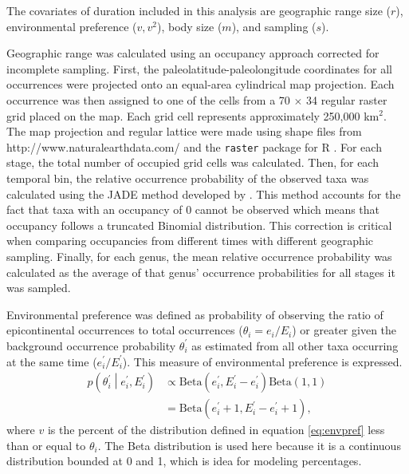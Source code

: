 \documentclass{article}
\begin{document}
The covariates of duration included in this analysis are geographic range size (\(r\)), environmental preference (\(v, v^{2}\)), body size (\(m\)), and sampling (\(s\)).

Geographic range was calculated using an occupancy approach corrected for incomplete sampling. First, the paleolatitude-paleolongitude coordinates for all occurrences were projected onto an equal-area cylindrical map projection. Each occurrence was then assigned to one of the cells from a 70 \(\times\) 34 regular raster grid placed on the map. Each grid cell represents approximately 250,000 km\(^{2}\). The map projection and regular lattice were made using shape files from http://www.naturalearthdata.com/ and the \texttt{raster} package for R \citep{raster}. For each stage, the total number of occupied grid cells was calculated. Then, for each temporal bin, the relative occurrence probability of the observed taxa was calculated using the \uppercase{jade} method developed by \citet{Chao2015a}. This method accounts for the fact that taxa with an occupancy of 0 cannot be observed which means that occupancy follows a truncated Binomial distribution. This correction is critical when comparing occupancies from different times with different geographic sampling. Finally, for each genus, the mean relative occurrence probability was calculated as the average of that genus' occurrence probabilities for all stages it was sampled.

Environmental preference was defined as probability of observing the ratio of epicontinental occurrences to total occurrences (\(\theta_{i} = e_{i} / E_{i}\)) or greater given the background occurrence probability \(\theta^{\prime}_{i}\) as estimated from all other taxa occurring at the same time (\(e^{\prime}_{i} / E^{\prime}_{i}\)). This measure of environmental preference is expressed.
\begin{equation}
  \begin{aligned}
    p\left(\theta^{\prime}_{i} \middle| e^{\prime}_{i}, E^{\prime}_{i} \right) &\propto \mathrm{Beta}(e^{\prime}_{i}, E^{\prime}_{i} - e^{\prime}_{i}) \mathrm{Beta}(1, 1) \\
    &= \mathrm{Beta}(e^{\prime}_{i} + 1, E^{\prime}_{i} - e^{\prime}_{i} + 1),
  \end{aligned}
  \label{eq:envpref}
\end{equation}
where \(v\) is the percent of the distribution defined in equation \ref{eq:envpref} less than or equal to \(\theta_{i}\). The Beta distribution is used here because it is a continuous distribution bounded at 0 and 1, which is idea for modeling percentages.
\end{document}

